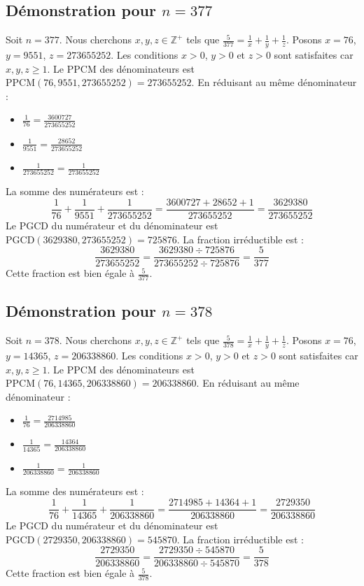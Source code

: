\documentclass[11pt,a4paper]{article}
\begin{document}
\subsection{Démonstration pour $n = 377$}
Soit $n = 377$. Nous cherchons $x, y, z \in \mathbb{Z}^{+}$ tels que $\frac{5}{377} = \frac{1}{x} + \frac{1}{y} + \frac{1}{z}$.
Posons $x = 76$, $y = 9551$, $z = 273655252$.
Les conditions $x > 0$, $y > 0$ et $z > 0$ sont satisfaites car $x, y, z \geq 1$.
Le PPCM des dénominateurs est $\text{PPCM}(76, 9551, 273655252) = 273655252$.
En réduisant au même dénominateur :
\begin{itemize}
    \item $\frac{1}{76} = \frac{3600727}{273655252}$
    \item $\frac{1}{9551} = \frac{28652}{273655252}$
    \item $\frac{1}{273655252} = \frac{1}{273655252}$
\end{itemize}
La somme des numérateurs est :
$$ \frac{1}{76} + \frac{1}{9551} + \frac{1}{273655252} = \frac{3600727 + 28652 + 1}{273655252} = \frac{3629380}{273655252} $$
Le PGCD du numérateur et du dénominateur est $\text{PGCD}(3629380, 273655252) = 725876$.
La fraction irréductible est :
$$ \frac{3629380}{273655252} = \frac{3629380 \div 725876}{273655252 \div 725876} = \frac{5}{377} $$
Cette fraction est bien égale à $\frac{5}{377}$.

\subsection{Démonstration pour $n = 378$}
Soit $n = 378$. Nous cherchons $x, y, z \in \mathbb{Z}^{+}$ tels que $\frac{5}{378} = \frac{1}{x} + \frac{1}{y} + \frac{1}{z}$.
Posons $x = 76$, $y = 14365$, $z = 206338860$.
Les conditions $x > 0$, $y > 0$ et $z > 0$ sont satisfaites car $x, y, z \geq 1$.
Le PPCM des dénominateurs est $\text{PPCM}(76, 14365, 206338860) = 206338860$.
En réduisant au même dénominateur :
\begin{itemize}
    \item $\frac{1}{76} = \frac{2714985}{206338860}$
    \item $\frac{1}{14365} = \frac{14364}{206338860}$
    \item $\frac{1}{206338860} = \frac{1}{206338860}$
\end{itemize}
La somme des numérateurs est :
$$ \frac{1}{76} + \frac{1}{14365} + \frac{1}{206338860} = \frac{2714985 + 14364 + 1}{206338860} = \frac{2729350}{206338860} $$
Le PGCD du numérateur et du dénominateur est $\text{PGCD}(2729350, 206338860) = 545870$.
La fraction irréductible est :
$$ \frac{2729350}{206338860} = \frac{2729350 \div 545870}{206338860 \div 545870} = \frac{5}{378} $$
Cette fraction est bien égale à $\frac{5}{378}$.
\end{document}
